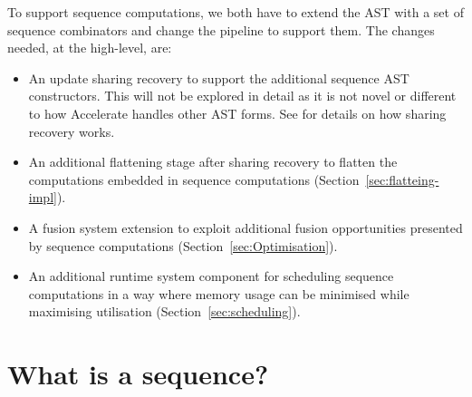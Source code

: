 To support sequence computations, we both have to extend the AST with a set of sequence combinators and change the pipeline to support them. The changes needed, at the high-level, are:
%
\begin{itemize}
%
\item An update sharing recovery to support the additional sequence AST constructors. This will not be explored in detail as it is not novel or different to how Accelerate handles other AST forms. See \citet{McDonell:acc-optim} for details on how sharing recovery works.
%
\item An additional flattening stage after sharing recovery to flatten the computations embedded in sequence computations (Section~\ref{sec:flatteing-impl}).
%
\item A fusion system extension to exploit additional fusion opportunities presented by sequence computations (Section~\ref{sec:Optimisation}).
%
\item An additional runtime system component for scheduling sequence computations in a way where memory usage can be minimised while maximising utilisation (Section~\ref{sec:scheduling}).
%
\end{itemize}



\section{What is a sequence?}

